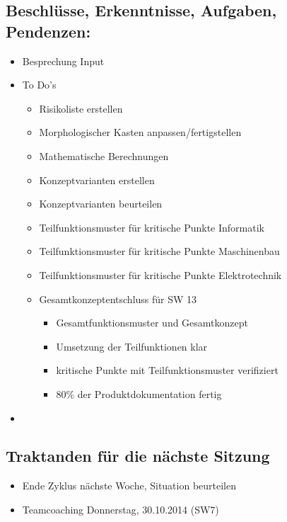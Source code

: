\documentclass[a4paper,10pt,fleqn]{article}
\begin{document}
\subsection*{Beschlüsse, Erkenntnisse, Aufgaben, Pendenzen:}
\begin{itemize}
    \item Besprechung Input
    \item To Do's
    \begin{itemize}
        \item Risikoliste erstellen
        \item Morphologischer Kasten anpassen/fertigstellen
        \item Mathematische Berechnungen
        \item Konzeptvarianten erstellen
        \item Konzeptvarianten beurteilen
        \item Teilfunktionsmuster für kritische Punkte Informatik
        \item Teilfunktionsmuster für kritische Punkte Maschinenbau
	    \item Teilfunktionsmuster für kritische Punkte Elektrotechnik
        \item Gesamtkonzeptentschluss für SW 13
        \begin{itemize}
            \item Gesamtfunktionsmuster und Gesamtkonzept
            \item Umsetzung der Teilfunktionen klar
            \item kritische Punkte mit Teilfunktionsmuster verifiziert
            \item 80\% der Produktdokumentation fertig
        \end{itemize}
    \end{itemize}
    \item 
\end{itemize}
%
\subsection*{Traktanden für die nächste Sitzung}
\begin{itemize}
    \item Ende Zyklus nächste Woche, Situation beurteilen
    \item Teamcoaching Donnerstag, 30.10.2014 (SW7)
    
\end{itemize}
%
\end{document}
